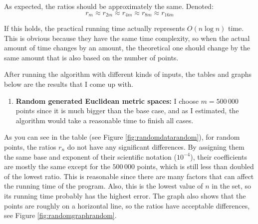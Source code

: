 \documentclass[12pt,english,]{article}
\providecommand{\tightlist}{%
  \setlength{\itemsep}{0pt}\setlength{\parskip}{0pt}}
\begin{document}
As expected, the ratios should be approximately the same. Denoted:
\[r_m \approx r_{2m} \approx r_{4m} \approx r_{8m} \approx r_{16m}\]

If this holds, the practical running time actually represents
\(O(n\log n)\) time. This is obvious because they have the same time
complexity, so when the actual amount of time changes by an amount, the
theoretical one should change by the same amount that is also based on
the number of points.

After running the algorithm with different kinds of inputs, the tables
and graphs below are the results that I come up with.

\begin{enumerate}
\def\labelenumi{\arabic{enumi}.}
\tightlist
\item
  \textbf{Random generated Euclidean metric spaces:} I choose
  \(m = 500\,000\) points since it is much bigger than the base case,
  and as I estimated, the algorithm would take a reasonable time to
  finish all cases.
\end{enumerate}

As you can see in the table (see Figure \ref{fig:randomdatarandom}), for
random points, the ratios \(r_n\) do not have any significant
differences. By assigning them the same base and exponent of their
scientific notation (\(10^{-4}\)), their coefficients are mostly the
same except for the \(500\,000\) points, which is still less than
doubled of the lowest ratio. This is reasonable since there are many
factors that can affect the running time of the program. Also, this is
the lowest value of \(n\) in the set, so its running time probably has
the highest error. The graph also shows that the points are roughly on a
horizontal line, so the ratios have acceptable differences, see Figure
\ref{fig:randomgraphrandom}.
\end{document}
